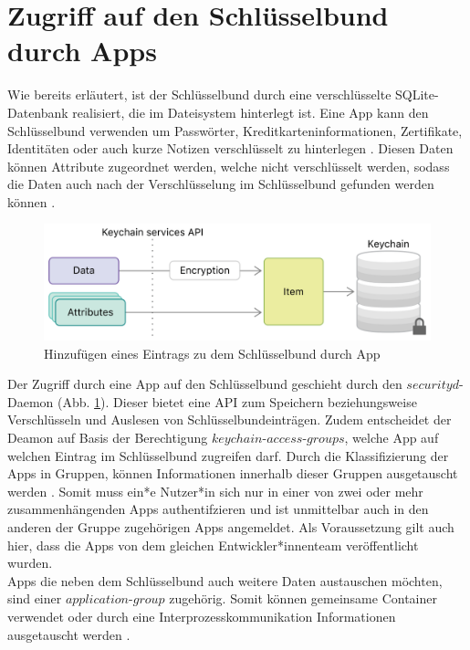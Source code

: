 \section{Zugriff auf den Schlüsselbund durch Apps}

Wie bereits erläutert, ist der Schlüsselbund durch eine verschlüsselte SQLite-Datenbank realisiert, die im Dateisystem hinterlegt ist. Eine App kann den Schlüsselbund verwenden um Passwörter, Kreditkarteninformationen, Zertifikate, Identitäten oder auch kurze Notizen verschlüsselt zu hinterlegen \cite{apple2020keychain_services}.
Diesen Daten können Attribute zugeordnet werden, welche nicht verschlüsselt werden, sodass die Daten auch nach der Verschlüsselung im Schlüsselbund gefunden werden können \cite{apple2020keychain_items}. 

\begin{figure}[h]
	\centering
  		\includegraphics[width=1\textwidth]{../images/keychain-api-example}
		\caption{Hinzufügen eines Eintrags zu dem Schlüsselbund durch App \cite{apple2020keychain_items}}
		\label{fig:add-entry-to-keychain}
\end{figure}

Der Zugriff durch eine App auf den Schlüsselbund geschieht durch den $securityd$-Daemon (Abb. \ref{fig:add-entry-to-keychain}). Dieser bietet eine API zum Speichern beziehungsweise Verschlüsseln und Auslesen von Schlüsselbundeinträgen. Zudem  entscheidet der Deamon auf Basis der Berechtigung $keychain$-$access$-$groups$, welche App auf welchen Eintrag im Schlüsselbund zugreifen darf. Durch die Klassifizierung der Apps in Gruppen, können Informationen innerhalb dieser Gruppen ausgetauscht werden \cite{apple2020keychain_item_groups}. Somit muss ein*e Nutzer*in sich nur in einer von zwei oder mehr zusammenhängenden Apps authentifzieren und ist unmittelbar auch in den anderen der Gruppe zugehörigen Apps angemeldet. Als Voraussetzung gilt auch hier, dass die Apps von dem gleichen Entwickler*innenteam veröffentlicht wurden. \\
Apps die neben dem Schlüsselbund auch weitere Daten austauschen möchten, sind einer $application$-$group$ zugehörig.  Somit können gemeinsame Container verwendet oder durch eine Interprozesskommunikation Informationen ausgetauscht werden \cite{apple2020keychain_application_groups}. 

